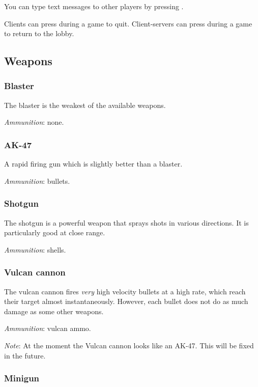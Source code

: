 \documentclass[a4paper]{article}
\begin{document}
You can type text messages to other players by pressing .

Clients can press  during a game to quit.  Client-servers can
press  during a game to return to the lobby.


\subsection{Weapons}

\subsubsection*{Blaster}

The blaster is the weakest of the available weapons.

\noindent
\emph{Ammunition}: none.

\subsubsection*{AK-47}

A rapid firing gun which is slightly better than a blaster.

\noindent
\emph{Ammunition}: bullets.

\subsubsection*{Shotgun}

The shotgun is a powerful weapon that sprays shots in various
directions.  It is particularly good at close range.

\noindent
\emph{Ammunition}: shells.

\subsubsection*{Vulcan cannon}

The vulcan cannon fires \emph{very} high velocity bullets at a high
rate, which reach their target almost instantaneously.  However, each
bullet does not do as much damage as some other weapons.

\noindent
\emph{Ammunition}: vulcan ammo.

\noindent
\emph{Note}: At the moment the Vulcan cannon looks like an AK-47.
This will be fixed in the future.

\subsubsection*{Minigun}
\end{document}
